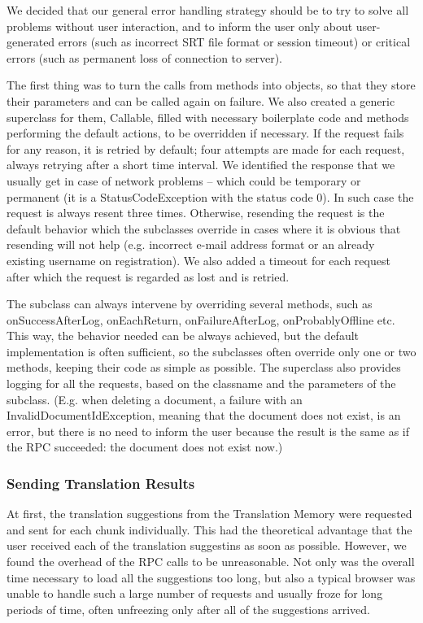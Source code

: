 We decided that our general error handling strategy should be to try to solve all problems without user interaction, and to inform the user only about user-generated errors (such as incorrect SRT file format or session timeout) or critical errors (such as permanent loss of connection to server).

The first thing was to turn the calls from methods into objects, so that they store their parameters and can be called again on failure. We also created a generic superclass for them, Callable, filled with necessary boilerplate code and methods performing the default actions, to be overridden if necessary. If the request fails for any reason, it is retried by default; four attempts are made for each request, always retrying after a short time interval. We identified the response that we usually get in case of network problems -- which could be temporary or permanent (it is a StatusCodeException with the status code 0). In such case the request is always resent three times. Otherwise, resending the request is the default behavior which the subclasses override in cases where it is obvious that resending will not help (e.g. incorrect e-mail address format or an already existing username on registration). We also added a timeout for each request after which the request is regarded as lost and is retried.

The subclass can always intervene by overriding several methods, such as onSuccessAfterLog, onEachReturn, onFailureAfterLog, onProbablyOffline etc. This way, the behavior needed can be always achieved, but the default implementation is often sufficient, so the subclasses often override only one or two methods, keeping their code as simple as possible. The superclass also provides logging for all the requests, based on the classname and the parameters of the subclass.
(E.g. when deleting a document, a failure with an InvalidDocumentIdException, meaning that the document does not exist, is an error, but there is no need to inform the user because the result is the same as if the RPC succeeded: the document does not exist now.)

\subsubsection{Sending Translation Results}

At first, the translation suggestions from the Translation Memory were requested and sent for each chunk individually. This had the theoretical advantage that the user received each of the translation suggestins as soon as possible. However, we found the overhead of the RPC calls to be unreasonable. Not only was the overall time necessary to load all the suggestions too long, but also a typical browser was unable to handle such a large number of requests and usually froze for long periods of time, often unfreezing only after all of the suggestions arrived.

